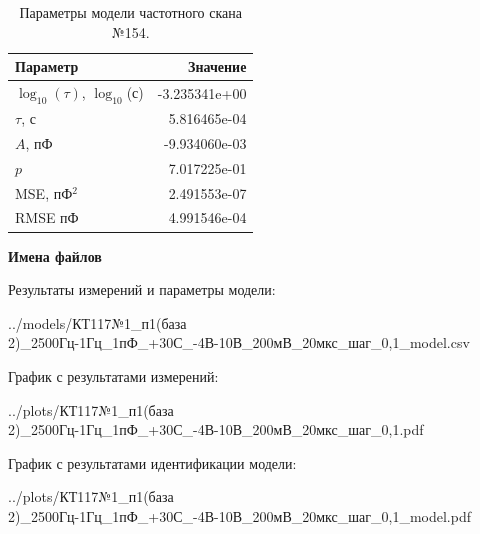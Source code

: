 \begin{table}[!ht]
    \centering
    \caption{Параметры модели частотного скана №154.}
    \begin{tabular}{|l|r|}
        \hline
        Параметр                                       & Значение                  \\ \hline
        $\log_{10}(\tau)$, $\log_{10}$(с)              & -3.235341e+00             \\ \hline
        $\tau$, с                                      & 5.816465e-04              \\ \hline
        $A$, пФ                                        & -9.934060e-03             \\ \hline
        $p$                                            & 7.017225e-01              \\ \hline
        MSE, пФ$^2$                                    & 2.491553e-07              \\ \hline
        RMSE пФ                                        & 4.991546e-04              \\ \hline
    \end{tabular}
    \label{table:frequency_scan_model_154}
\end{table}

\textbf{Имена файлов}

Результаты измерений и параметры модели:

\scriptsize../models/КТ117№1\_п1(база 2)\_2500Гц-1Гц\_1пФ\_+30С\_-4В-10В\_200мВ\_20мкс\_шаг\_0,1\_model.csv
\normalsize

График с результатами измерений:

\scriptsize../plots/КТ117№1\_п1(база 2)\_2500Гц-1Гц\_1пФ\_+30С\_-4В-10В\_200мВ\_20мкс\_шаг\_0,1.pdf
\normalsize

График с результатами идентификации модели:

\scriptsize../plots/КТ117№1\_п1(база 2)\_2500Гц-1Гц\_1пФ\_+30С\_-4В-10В\_200мВ\_20мкс\_шаг\_0,1\_model.pdf
\normalsize

